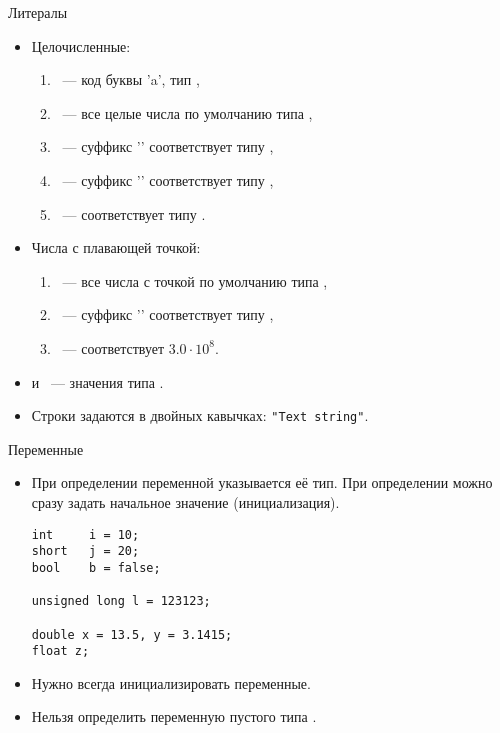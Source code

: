\documentclass{beamer}
\begin{document}
\begin{frame}[fragile]{Литералы}
\begin{itemize}
    \item Целочисленные:
        \begin{enumerate}
            \item {}~--- код буквы 'a', тип ,
            \item {} ~--- все целые числа по умолчанию типа ,
            \item {}~--- суффикс '' соответствует типу ,
            \item {}~--- суффикс '' соответствует типу ,
            \item {}~--- соответствует типу .
        \end{enumerate}

    \item Числа с плавающей точкой:
        \begin{enumerate}
            \item {}~--- 
                все числа с точкой по умолчанию типа ,
            \item {}~--- суффикс '' соответствует типу 
                ,
            \item {}~--- соответствует $3.0\cdot 10^{8}$.
        \end{enumerate}
    \item {} и ~--- значения типа .

    \item Строки задаются в двойных кавычках: \verb!"Text string"!.

\end{itemize}
\end{frame}

\begin{frame}[fragile]{Переменные}
\begin{itemize}
    \item При определении переменной указывается её тип. При определении можно
        сразу задать начальное значение (инициализация).
    \begin{lstlisting}
int     i = 10;
short   j = 20;
bool    b = false;

unsigned long l = 123123;

double x = 13.5, y = 3.1415;
float z;
    \end{lstlisting}

    \item Нужно всегда инициализировать переменные.

    \item Нельзя определить переменную пустого типа .
\end{itemize}
\end{frame}
\end{document}
